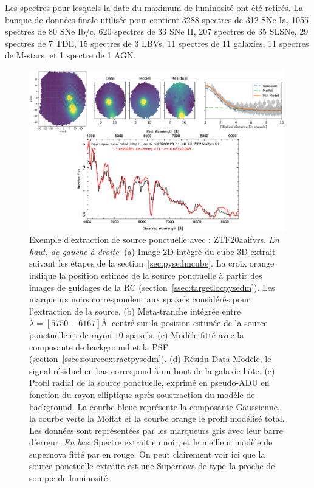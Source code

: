 \documentclass[../main/main.tex]{subfiles}
\begin{document}
Les spectres pour lesquels la date du maximum de luminosité ont été
retirés.
La banque de données finale utilisée pour  contient 3288 spectres de 312 SNe Ia, 1055 spectres de 80 SNe Ib/c, 620 spectres de 33 SNe II, 207 spectres de 35 SLSNe, 29 spectres de 7 TDE, 15 spectres de 3 LBVs, 11 spectres de 11 galaxies, 11 spectres de M-stars, et 1 spectre de 1 AGN.
\begin{figure}
  
  \includegraphics[width=0.99\textwidth]{../figures/03_sedm/pysedmoutput.png}
  \caption[Exemple d'extraction de source ponctuelle avec
  \pysedm]{Exemple d'extraction de source ponctuelle avec \pysedm:
    ZTF20aaifyrs. \textit{En haut, de gauche à droite}: (a) Image 2D intégré
    du cube 3D extrait suivant les étapes de la section~\ref{sec:pysedmcube}. La croix orange indique la position estimée de la source
  ponctuelle à partir des images de guidages de la RC
  (section~\ref{ssec:targetlocpysedm}). Les marqueurs noirs
  correspondent aux spaxels considérés pour l'extraction de la source. (b) Meta-tranche intégrée entre
  $\lambda=[5750-6167]$\AA\, centré sur la position estimée de la source
ponctuelle et de rayon $10$ spaxels. (c) Modèle fitté avec la composante
de background et la PSF (section~\ref{ssec:sourceextractpysedm}). (d)
Résidu Data-Modèle, le signal résiduel en bas correspond à un bout de la
galaxie hôte. (e) Profil radial de la source ponctuelle, exprimé en
pseudo-ADU en fonction du rayon elliptique après soustraction du modèle de background. La courbe bleue
représente la composante Gaussienne, la courbe verte la Moffat et la
courbe orange le profil modélisé total. Les données sont représentées par les
marqueurs gris avec leur barre d'erreur. \textit{En bas}: Spectre
extrait en noir, et le meilleur modèle de supernova fitté par 
en rouge. On peut clairement voir ici que la source ponctuelle extraite
est une Supernova de type Ia proche de son pic de luminosité.}
  \label{fig:pysedmoutput}
\end{figure}
\end{document}

